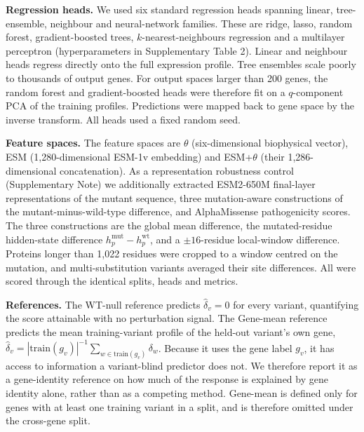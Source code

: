 \documentclass[11pt,letterpaper]{article}
\begin{document}
\textbf{Regression heads.} We used six standard regression heads spanning linear, tree-ensemble, neighbour and neural-network families. These are ridge, lasso, random forest, gradient-boosted trees, $k$-nearest-neighbours regression and a multilayer perceptron (hyperparameters in Supplementary Table 2). Linear and neighbour heads regress directly onto the full expression profile. Tree ensembles scale poorly to thousands of output genes. For output spaces larger than 200 genes, the random forest and gradient-boosted heads were therefore fit on a $q$-component PCA of the training profiles. Predictions were mapped back to gene space by the inverse transform. All heads used a fixed random seed.

\textbf{Feature spaces.} The feature spaces are $\theta$ (six-dimensional biophysical vector), ESM (1,280-dimensional ESM-1v embedding) and ESM+$\theta$ (their 1,286-dimensional concatenation). As a representation robustness control (Supplementary Note) we additionally extracted ESM2-650M\cite{ESM2} final-layer representations of the mutant sequence, three mutation-aware constructions of the mutant-minus-wild-type difference, and AlphaMissense\cite{AlphaMissense} pathogenicity scores. The three constructions are the global mean difference, the mutated-residue hidden-state difference $h^{\mathrm{mut}}_p - h^{\mathrm{wt}}_p$, and a $\pm16$-residue local-window difference. Proteins longer than 1{,}022 residues were cropped to a window centred on the mutation, and multi-substitution variants averaged their site differences. All were scored through the identical splits, heads and metrics.

\textbf{References.} The WT-null reference predicts $\hat{\delta}_v = 0$ for every variant, quantifying the score attainable with no perturbation signal. The Gene-mean reference predicts the mean training-variant profile of the held-out variant's own gene, $\hat{\delta}_v = |{\mathrm{train}(g_v)}|^{-1}\sum_{w \in \mathrm{train}(g_v)} \delta_w$. Because it uses the gene label $g_v$, it has access to information a variant-blind predictor does not. We therefore report it as a gene-identity reference on how much of the response is explained by gene identity alone, rather than as a competing method. Gene-mean is defined only for genes with at least one training variant in a split, and is therefore omitted under the cross-gene split.
\end{document}
